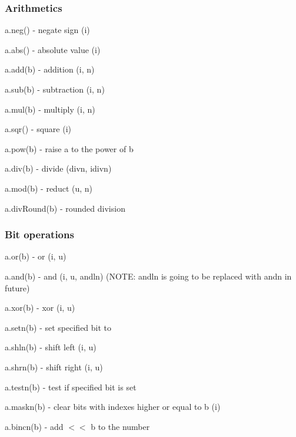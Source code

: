 \subsubsection*{Arithmetics}


\begin{DoxyItemize}
\item {\ttfamily a.\+neg()} -\/ negate sign ({\ttfamily i})
\item {\ttfamily a.\+abs()} -\/ absolute value ({\ttfamily i})
\item {\ttfamily a.\+add(b)} -\/ addition ({\ttfamily i}, {\ttfamily n})
\item {\ttfamily a.\+sub(b)} -\/ subtraction ({\ttfamily i}, {\ttfamily n})
\item {\ttfamily a.\+mul(b)} -\/ multiply ({\ttfamily i}, {\ttfamily n})
\item {\ttfamily a.\+sqr()} -\/ square ({\ttfamily i})
\item {\ttfamily a.\+pow(b)} -\/ raise {\ttfamily a} to the power of {\ttfamily b}
\item {\ttfamily a.\+div(b)} -\/ divide ({\ttfamily divn}, {\ttfamily idivn})
\item {\ttfamily a.\+mod(b)} -\/ reduct ({\ttfamily u}, {\ttfamily n})
\item {\ttfamily a.\+div\+Round(b)} -\/ rounded division
\end{DoxyItemize}

\subsubsection*{Bit operations}


\begin{DoxyItemize}
\item {\ttfamily a.\+or(b)} -\/ or ({\ttfamily i}, {\ttfamily u})
\item {\ttfamily a.\+and(b)} -\/ and ({\ttfamily i}, {\ttfamily u}, {\ttfamily andln}) (N\+O\+TE\+: {\ttfamily andln} is going to be replaced with {\ttfamily andn} in future)
\item {\ttfamily a.\+xor(b)} -\/ xor ({\ttfamily i}, {\ttfamily u})
\item {\ttfamily a.\+setn(b)} -\/ set specified bit to {}
\item {\ttfamily a.\+shln(b)} -\/ shift left ({\ttfamily i}, {\ttfamily u})
\item {\ttfamily a.\+shrn(b)} -\/ shift right ({\ttfamily i}, {\ttfamily u})
\item {\ttfamily a.\+testn(b)} -\/ test if specified bit is set
\item {\ttfamily a.\+maskn(b)} -\/ clear bits with indexes higher or equal to {\ttfamily b} ({\ttfamily i})
\item {\ttfamily a.\+bincn(b)} -\/ add { $<$$<$ b} to the number
\end{DoxyItemize}

